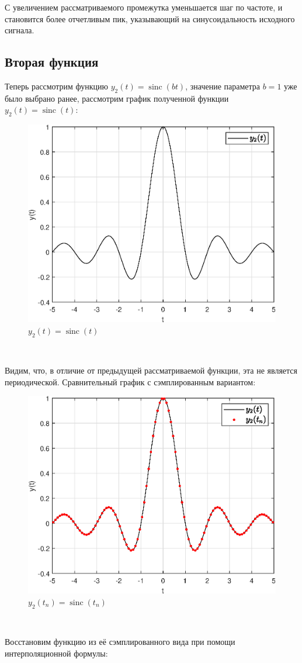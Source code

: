 \documentclass[a4paper]{article}
\begin{document}
С увеличением рассматриваемого промежутка уменьшается шаг по частоте, и становится более отчетливым пик, указывающий на синусоидальность исходного сигнала.

\subsection{Вторая функция}

Теперь рассмотрим функцию $y_2(t) = \operatorname{sinc}(bt)$, значение параметра $b = 1$ уже было выбрано ранее, рассмотрим график полученной функции $y_2(t) = \operatorname{sinc}(t)$:

\begin{figure}[H]
    \centering
    \includegraphics[width=0.55\linewidth]{graphs2/func2.eps}
    \caption{$y_2(t) = \operatorname{sinc}(t)$}
\end{figure}\ 

Видим, что, в отличие от предыдущей рассматриваемой функции, эта не является периодической. Сравнительный график с сэмплированным вариантом:

\begin{figure}[H]
    \centering
    \includegraphics[width=0.55\linewidth]{graphs2/func2+discrete.eps}
    \caption{$y_2(t_n) = \operatorname{sinc}(t_n)$}
\end{figure}\ 

Восстановим функцию из её сэмплированного вида при помощи интерполяционной формулы:
\end{document}
